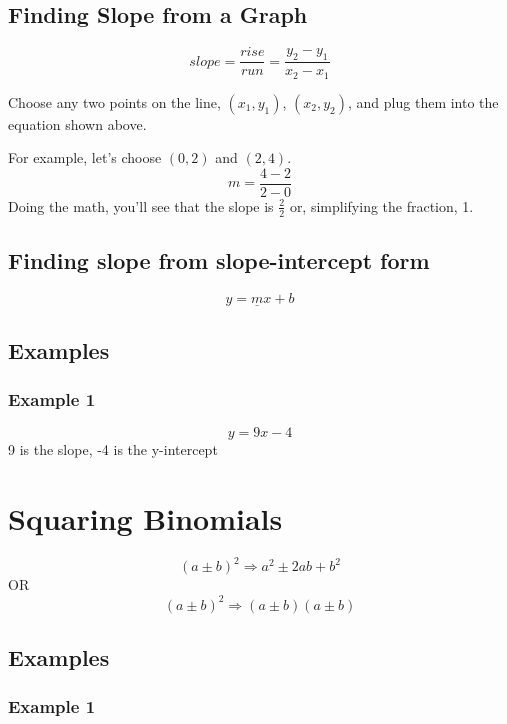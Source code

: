 \documentclass{article}
\begin{document}
\subsection{Finding Slope from a Graph}

\begin{center}  \end{center}

$$slope = \frac{rise}{run} = \frac{y_2 - y_1}{x_2 - x_1}$$

Choose any two points on the line, $(x_1, y_1)$, $(x_2, y_2)$, and plug them into the equation shown above.

For example, let's choose $(0,2)$ and $(2,4)$.
$$ m = \frac{4 - 2}{2 - 0}$$
Doing the math, you'll see that the slope is $\frac{2}{2}$ or, simplifying the fraction, 1.

\subsection{Finding slope from slope-intercept form}
	$$y = \underline{m}x+b$$
\subsection{Examples}
\subsubsection{Example 1}
$$y = 9x - 4$$
9 is the slope, -4 is the y-intercept

\section{Squaring Binomials}

$$(a \pm b)^2 \Rightarrow a^2 \pm 2ab + b^2$$  
OR
$$(a \pm b)^2 \Rightarrow (a \pm b)(a \pm b)$$

\subsection{Examples}
\subsubsection{Example 1}
\end{document}
